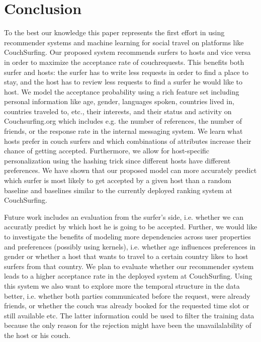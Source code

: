 \section{Conclusion} \label{sec:conclusion}

To the best our knowledge this paper represents the first effort in using recommender systems and machine learning for social travel on platforms like CouchSurfing.
Our proposed system recommends surfers to hosts and vice versa in order to maximize the acceptance rate of couchrequests. This benefits both surfer and hosts: the surfer has to write less requests in order to find a place to
stay, and the host has to review less requests to find a surfer he would like to host.
We model the acceptance probability using a rich feature set including personal information like age, gender, languages spoken, countries lived in, countries traveled to, etc., their interests, and their status and activity on Couchsurfing.org which includes e.g. the number of references, the number of friends, or the response rate in the internal messaging system.
We learn what hosts prefer in couch surfers and which combinations of attributes increase their chance of getting accepted. Furthermore, we allow for host-specific personalization using the hashing trick since different hosts have 
different preferences.
We have shown that our proposed model can more accurately predict which surfer is most likely to get accepted by a given host than a random baseline and baselines similar to the currently deployed ranking system at CouchSurfing.

Future work includes an evaluation from the surfer's side, i.e. whether we can accuratly predict by which host he is going to be accepted. Further, we would like to investigate the benefits of modeling more dependencies across user properties and preferences (possibly using kernels), i.e. whether age influences preferences in gender or whether a host that wants to travel to a certain country likes to host surfers from that country. We plan to evaluate whether our recommender system leads to a higher acceptance rate in the deployed system at CouchSurfing. Using this system we also want to explore more the temporal structure in the data better, i.e. whether both parties communicated before the request, were already friends, or whether the couch was already booked for the requested time slot or still available etc. The latter information could be used to filter the training data because the only reason for the rejection might have been the unavailalability of the host or his couch.

